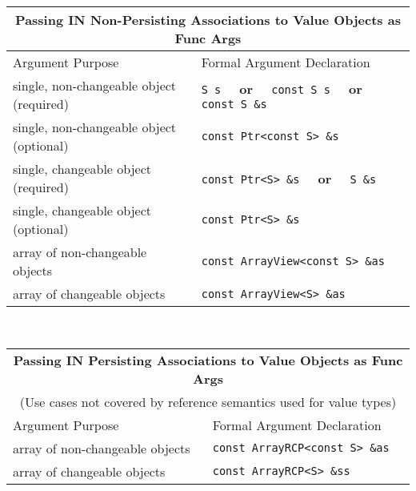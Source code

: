 \begin{tabular}{|l|l|}
%
\multicolumn{2}{c}{\textbf{Passing IN Non-Persisting Associations to Value Objects as Func Args}} \\
%
\hline
Argument Purpose
& Formal Argument Declaration \\
\hline
\hline
single, non-changeable object (required)
& {}\texttt{S s} $\;\;\;\;$\textbf{or}$\;\;\;\;$ {}\texttt{const S s} $\;\;\;\;$\textbf{or}$\;\;\;\;$ {}\texttt{const S \&s} \\
\hline
single, non-changeable object (optional)
& {}\texttt{const Ptr<const S> \&s} \\
\hline
single, changeable object (required)
& {}\texttt{const Ptr<S> \&s}  $\;\;\;\;$\textbf{or}$\;\;\;\;$ {}\texttt{S \&s} \\
\hline
single, changeable object (optional)
& \texttt{const Ptr<S> \&s} \\
\hline
array of non-changeable objects
& {}\texttt{const ArrayView<const S> \&as} \\
\hline
array of changeable objects
& {}\texttt{const ArrayView<S> \&as} \\
\hline
%
\end{tabular} \\[3ex]
%
\begin{tabular}{|l|l|}
%
\multicolumn{2}{c}{\textbf{Passing IN Persisting Associations to Value Objects as Func Args}} \\
\multicolumn{2}{c}{(Use cases not covered by reference semantics used for value types)} \\
%
\hline
Argument Purpose
& Formal Argument Declaration \\
\hline
\hline
array of non-changeable objects
& {}\texttt{const ArrayRCP<const S> \&as} \\
\hline
array of changeable objects
& {}\texttt{const ArrayRCP<S> \&ss} \\
\hline
\end{tabular} \\[3ex]
